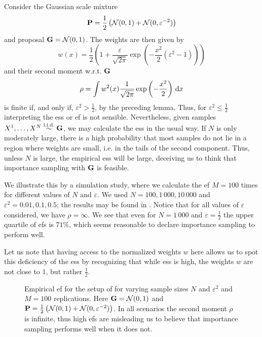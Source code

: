 \begin{example}
    \label{ex:ess_failure}
    Consider the Gaussian scale mixture
    $$
    \P = \frac{1}{2} \left(\mathcal N (0,1) + \mathcal N(0, \varepsilon^{-2})\right)
    $$
    and proposal $\G = \mathcal N(0, 1)$. The weights are then given by 
    $$
        w(x) = \frac{1}{2} \left( 1 + \frac{\varepsilon}{\sqrt{2\pi}} \exp \left( - \frac{x^{2}}{2} \left( \varepsilon^{2} - 1\right) \right)\right)
    $$ and their second moment w.r.t. $\G$ 
    $$
    \rho = \int w^{2}(x) \frac{1}{\sqrt{2\pi}} \exp \left( -\frac{x^{2}}{2} \right) \d x
    $$
    is finite if, and only if, $\varepsilon^{2} > \frac{1}{2}$, by the preceding lemma. Thus, for $\varepsilon^{2} \leq \frac{1}{2}$ interpreting the \gls{ess} or \gls{ef} is not sensible. Nevertheless, given samples $X^{1}, \dots, X^{N} \iid \G$, we may calculate the \gls{ess} in the usual way. If $N$ is only moderately large, there is a high probability that most samples do not lie in a region where weights are small, i.e. in the tails of the second component. Thus, unless $N$ is large, the empirical \gls{ess} will be large, deceiving us to think that importance sampling with $\G$ is feasible.

    We illustrate this by a simulation study, where we calculate the \gls{ef} $M=100$ times for different values of $N$ and $\varepsilon$. We used $N = 100, 1\,000, 10\,000$ and $\varepsilon^{2} = 0.01, 0.1, 0.5$; the results may be found in . Notice that for all values of $\varepsilon$ considered, we have $\rho = \infty$. We see that even for $N = 1\,000$ and $\varepsilon = \frac{1}{2}$ the upper quartile of \glspl{ef} is $71\%$, which seems reasonable to declare importance sampling to perform well. 

    Let us note that having access to the normalized weights $w$ here allows us to spot this deficiency of the \gls{ess} by recognizing that while \gls{ess} is high, the weights $w$ are not close to $1$, but rather $\frac{1}{2}$.

    \begin{figure}
        \centering

        \resizebox{\textwidth}{!}{%
        }
        \caption{Empirical \gls{ef} for the setup of  for varying sample sizes $N$ and $\varepsilon^{2}$ and $M=100$ replications. Here $\G = \mathcal N(0,1)$ and $\P = \frac{1}{2} \left( \mathcal N (0,1) + \mathcal N(0, \varepsilon^{-2}) \right)$. In all scenarios the second moment $\rho$ is infinite, thus high \glspl{ef} are misleading us to believe that importance sampling performs well when it does not.}
        \label{fig:ess_failure}
    \end{figure}

\end{example}

